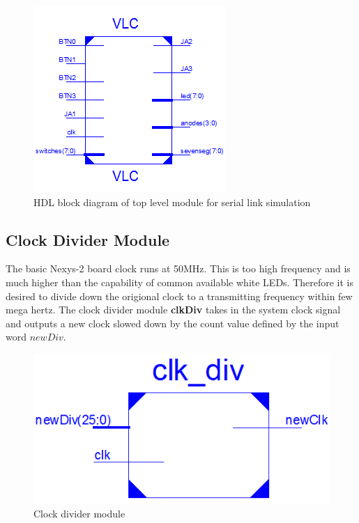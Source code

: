 

\begin{figure}[!htbp]
	\centering
	\includegraphics[width=.5\textwidth]{./Figures/vlc.png}
	\caption[Toplevel VLC module]{HDL block diagram of top level module for serial link simulation}
	\label{fig:vlc}
\end{figure}

\subsection{Clock Divider Module}
The basic Nexys-2 board clock runs at 50MHz. This is too high frequency and is much higher than the capability of common available white LEDs. Therefore it is desired to divide down the origional clock to a transmitting frequency within few mega hertz. The clock divider module \textbf{clkDiv} takes in the system clock signal and outputs a new clock slowed down by the count value defined by the input word $newDiv$.

\begin{figure}[!htbp]
	\centering
	\includegraphics[width=.5\textwidth]{./Figures/clk_div.png}
	\caption[]{Clock divider module}
	\label{fig:clkDiv}
\end{figure}


